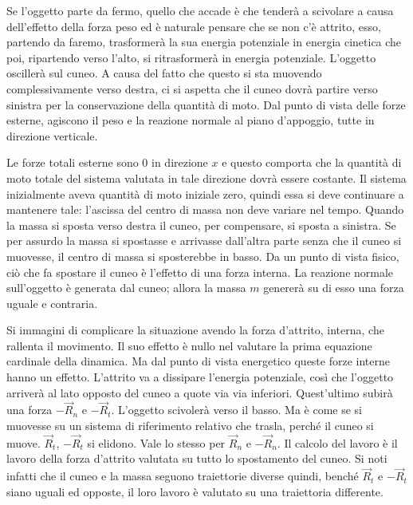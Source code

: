 \begin{figure}[htpb]
\end{figure}
\FloatBarrier
Se l'oggetto parte da fermo, quello che accade è che tenderà a scivolare a causa dell'effetto della forza peso ed è naturale pensare che se non c'è attrito, esso, partendo da faremo, trasformerà la sua energia potenziale in energia cinetica che poi, ripartendo verso l'alto, si ritrasformerà in energia potenziale. L'oggetto oscillerà sul cuneo. A causa del fatto che questo si sta muovendo complessivamente verso destra, ci si aspetta che il cuneo dovrà partire verso sinistra per la conservazione della quantità di moto. Dal punto di vista delle forze esterne, agiscono il peso e la reazione normale al piano d'appoggio, tutte in direzione verticale.

Le forze totali esterne sono $0$ in direzione $x$ e questo comporta che la quantità di moto totale del sistema valutata in tale direzione dovrà essere costante. Il sistema inizialmente aveva quantità di moto iniziale zero, quindi essa si deve continuare a mantenere tale: l'ascissa del centro di massa non deve variare nel tempo. Quando la massa si sposta verso destra il cuneo, per compensare, si sposta a sinistra. Se per assurdo la massa si spostasse e arrivasse dall'altra parte senza che il cuneo si muovesse, il centro di massa si sposterebbe in basso. Da un punto di vista fisico, ciò che fa spostare il cuneo è l'effetto di una forza interna. La reazione normale sull'oggetto è generata dal cuneo; allora la massa $m$ genererà su di esso una forza uguale e contraria.

Si immagini di complicare la situazione avendo la forza d'attrito, interna, che rallenta il movimento. Il suo effetto è nullo nel valutare la prima equazione cardinale della dinamica. Ma dal punto di vista energetico queste forze interne hanno un effetto. L'attrito va a dissipare l'energia potenziale, così che l'oggetto arriverà al lato opposto del cuneo a quote via via inferiori. Quest'ultimo subirà una forza $-\vec{R}_n$ e $-\vec{R}_t$. L'oggetto scivolerà verso il basso. Ma è come se si muovesse su un sistema di riferimento relativo che trasla, perché il cuneo si muove. $\vec{R}_t$, $-\vec{R}_t$ si elidono. Vale lo stesso per $\vec{R}_n$ e $-\vec{R}_n$. Il calcolo del lavoro è il lavoro della forza d'attrito valutata su tutto lo spostamento del cuneo. Si noti infatti che il cuneo e la massa seguono traiettorie diverse quindi, benché $\vec{R}_t$ e $-\vec{R}_t$ siano uguali ed opposte, il loro lavoro è valutato su una traiettoria differente.

